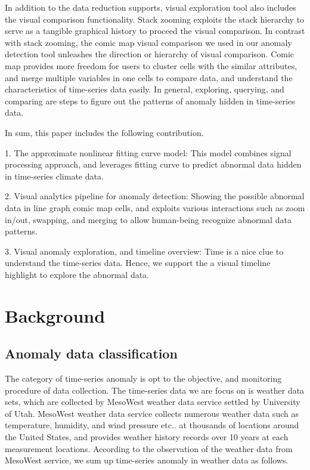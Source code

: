 \documentclass{vgtc}                          %
\begin{document}
In addition to the data reduction supports, visual exploration tool also includes the visual comparison functionality. Stack zooming \cite{javed2010stack} exploits the stack hierarchy to serve as a tangible graphical history to proceed the visual comparison. In contrast with stack zooming, the comic map visual comparison we used in our anomaly detection tool unleashes the direction or hierarchy of visual comparison. Comic map provides more freedom for users to cluster cells with the similar attributes, and merge multiple variables in one cells to compare data, and understand the characteristics of time-series data easily. In general, exploring, querying, and comparing are steps to figure out the patterns of anomaly hidden in time-series data.
		
In sum, this paper includes the following contribution. 

1. The approximate nonlinear fitting curve model: This model combines signal processing approach, and leverages fitting curve to predict abnormal data hidden in time-series climate data.  
 
2. Visual analytics pipeline for anomaly detection: Showing the possible abnormal data in line graph comic map cells, and exploits various interactions such as zoom in/out, swapping, and merging to allow human-being recognize abnormal data patterns.

3. Visual anomaly exploration, and timeline overview: Time is a nice clue to understand the time-series data. Hence, we support the a visual timeline highlight to explore the abnormal data.    

\section{Background}

\subsection{Anomaly data classification}

The category of time-series anomaly is opt to the objective, and monitoring procedure of data collection. The time-series data we are focus on is weather data sets, which are collected by MesoWest weather data service settled by University of Utah. MesoWest weather data service collects numerous weather data such as temperature, humidity, and wind pressure etc.. at thousands of locations around the United States, and provides weather history records over 10 years at each measurement locations. According to the observation of the weather data from MesoWest service, we sum up time-series anomaly in weather data as follows.
\end{document}
